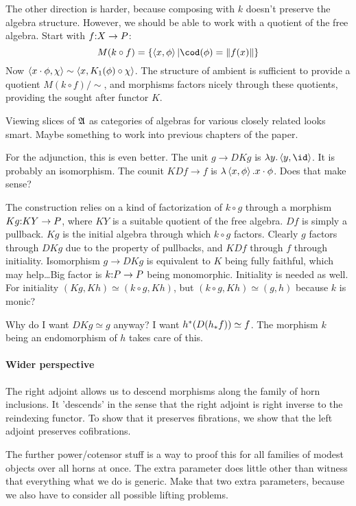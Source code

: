 \documentclass[csh.tex]{subfiles}
\begin{document}
The other direction is harder, because composing with $k$ doesn't preserve the algebra structure. However, we should be able to work with a quotient of the free algebra. Start with $f\mathord : X\to P$:
\[ M(k\circ f) = \set{\tuplet{x,\phi}|\cod(\phi) = \norm{ f(x) }}\]
Now $\left\langle x\cdot\phi,\chi \right\rangle \sim \left\langle x,K_1(\phi)\circ \chi \right\rangle$. The structure of ambient is sufficient to provide a quotient $M(k\circ f)/\sim$, and morphisms factors nicely through these quotients, providing the sought after functor $K$.

Viewing slices of $\mathfrak A$ as categories of algebras for various closely related looks smart. Maybe something to work into previous chapters of the paper.

For the adjunction, this is even better. The unit $g \to DKg$ is $\function y \tuplet{y,\id}$. It is probably an isomorphism.
The counit $KDf \to f$ is $\lambda \left\langle x,\phi \right\rangle . x\cdot\phi$. Does that make sense?

The construction relies on a kind of factorization of $k\circ g$ through a morphism $Kg\mathord : KY \to P$, where $KY$ is a suitable quotient of the free algebra.
$Df$ is simply a pullback. $Kg$ is the initial algebra through which $k\circ g$ factors. Clearly $g$ factors through $DKg$ due to the property of pullbacks, and $KDf$ through $f$ through initiality. Isomorphism $g\to DKg$ is equivalent to $K$ being fully faithful, which may help\dots Big factor is $k\mathord : P\to P$ being monomorphic. Initiality is needed as well. For initiality $(Kg,Kh)\simeq (k\circ g,Kh)$, but $(k\circ g,Kh)\simeq (g,h)$ because $k$ is monic?

Why do I want $DKg\simeq g$ anyway? I want $h^*(D(h_*f))\simeq f$. The morphism $k$ being an endomorphism of $h$ takes care of this.

\paragraph{Wider perspective}
The right adjoint allows us to descend morphisms along the family of horn inclusions.
It 'descends' in the sense that the right adjoint is right inverse to the reindexing functor.
To show that it preserves fibrations, we show that the left adjoint preserves cofibrations.

The further power/cotensor stuff is a way to proof this for all families of modest objects over all horns at once.
The extra parameter does little other than witness that everything what we do is generic. Make that two extra parameters,
because we also have to consider all possible lifting problems.
\end{document}
